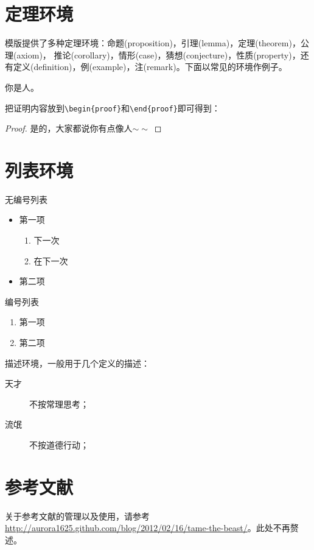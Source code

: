\section{定理环境}
模版提供了多种定理环境：命题(proposition)，引理(lemma)，定理(theorem)，公理(axiom)， 推论(corollary)，情形(case)，猜想(conjecture)，性质(property)，还有定义(definition)，例(example)，注(remark)。下面以常见的环境作例子。\cite{Barman2006,Berry2007,Boutsidis2008,Buciu2006,Cai2005,Chen2008,Cichocki2006,Cichocki2008,Cichocki2007,Cichocki2007a,Cichocki}
\begin{theorem}[人论]\label{thm:ex1}
你是人。
\end{theorem}
把证明内容放到\verb|\begin{proof}|和\verb|\end{proof}|即可得到：
\begin{proof}
是的，大家都说你有点像人$\sim\sim$
\end{proof}

\section{列表环境}
无编号列表
\begin{itemize}
\item 第一项
	\begin{enumerate}
	\item 下一次
	\item 在下一次
	\end{enumerate}
\item 第二项
\end{itemize}

编号列表
\begin{enumerate}
\item 第一项
\item 第二项
\end{enumerate}

描述环境，一般用于几个定义的描述：
\begin{description}
  \item[天才] 不按常理思考；
  \item[流氓] 不按道德行动；
\end{description}

\section{参考文献}

关于参考文献的管理以及使用，请参考 \url{http://aurora1625.github.com/blog/2012/02/16/tame-the-beast/}。此处不再赘述。


